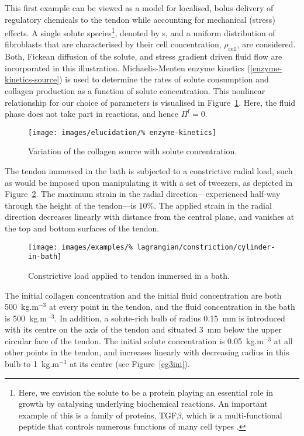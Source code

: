 This first example can be viewed as a model for localised, bolus
delivery of regulatory chemicals to the tendon while accounting for
mechanical (stress) effects. A single solute species\footnote{Here, we
  envision the solute to be a protein playing an essential role in
  growth by catalysing underlying biochemical reactions. An important
  example of this is a family of proteins, TGF$\beta$, which is a
  multi-functional peptide that controls numerous functions of many
  cell types \citep{Alberts:02}.}, denoted by s, and a uniform
distribution of fibroblasts that are characterised by their cell
concentration, $\rho_{\mathrm{cell}}$, are considered. Both, Fickean
diffusion of the solute, and stress gradient driven fluid flow are
incorporated in this illustration. Michaelis-Menten enzyme kinetics
(\ref{enzyme-kinetics-source}) is used to determine the rates of
solute consumption and collagen production as a function of solute
concentration. This nonlinear relationship for our choice of
parameters is visualised in Figure~\ref{eg3menten}. Here, the fluid
phase does not take part in reactions, and hence $\Pi^\mathrm{f}=0$.

\begin{figure}[!hpt]
  \centering
  \texttt{[image: images/elucidation/\%
    enzyme-kinetics]}
  \caption{Variation of the collagen source with solute
    concentration.}
  \label{eg3menten}
\end{figure}

The tendon immersed in the bath is subjected to a constrictive radial
load, such as would be imposed upon manipulating it with a set of
tweezers, as depicted in Figure~\ref{constrictload}. The maximum
strain in the radial direction---experienced half-way through the
height of the tendon---is 10\%. The applied strain in the radial
direction decreases linearly with distance from the central plane, and
vanishes at the top and bottom surfaces of the tendon.

\begin{figure}[!hpt]
  \centering
  \texttt{[image: images/examples/\%
    lagrangian/constriction/cylinder-in-bath]}
  \caption{Constrictive load applied to tendon immersed in a bath.}
  \label{constrictload}
\end{figure}

The initial collagen concentration and the initial fluid concentration
are both 500~kg.m$^{-3}$ at every point in the tendon, and the fluid
concentration in the bath is 500~kg.m$^{-3}$. In addition, a
solute-rich bulb of radius 0.15~mm is introduced with its centre on
the axis of the tendon and situated 3~mm below the upper circular face
of the tendon. The initial solute concentration is 0.05~kg.m$^{-3}$ at
all other points in the tendon, and increases linearly with decreasing
radius in this bulb to 1~kg.m$^{-3}$ at its centre (see
Figure~\ref{eg3ini}).

